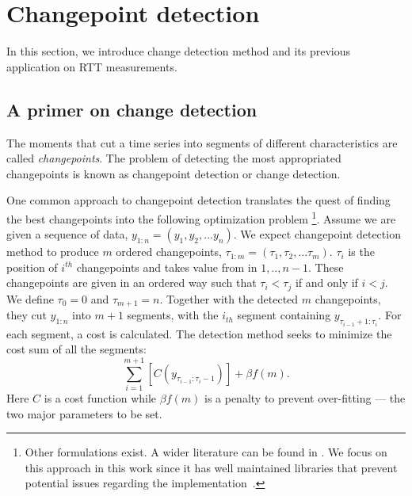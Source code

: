 \section{Changepoint detection}
\label{sec:cpt}
In this section, we introduce change detection method and its previous application on RTT measurements.

\subsection{A primer on change detection}
The moments that cut a time series into segments of different characteristics are called \textit{changepoints}.
The problem of detecting the most appropriated changepoints is known as changepoint detection or change detection.

One common approach to changepoint detection translates the quest of finding the best changepoints into the following optimization problem \footnote{Other formulations exist. A wider literature can be found in \cite{Haynes2016, Eckley2011}. We focus on this approach in this work since it has well maintained libraries that prevent potential issues regarding the implementation~\cite{Killick2013a, Haynes2016}.}.
Assume we are given a sequence of data, $y_{1:n} = (y_1, y_2,...y_n)$.
We expect changepoint detection method to produce $m$ ordered changepoints, $\tau_{1:m} = (\tau_1, \tau_2,...\tau_m)$.
$\tau_i$ is the position of $i^{th}$ changepoints and takes value from in ${1,..,n-1}$.
These changepoints are given in an ordered way such that $\tau_i < \tau_j$ if and only if $i < j$.
We define $\tau_0 = 0$ and $\tau_{m+1} = n$.
Together with the detected $m$ changepoints, they cut $y_{1:n}$ into $m+1$ segments, with the $i_{th}$ segment containing $y_{\tau_{i-1}+1:\tau_i}$.
For each segment, a cost is calculated. The detection method seeks to minimize the cost sum of all the segments: 
\begin{equation*}
\sum_{i=1}^{m+1}[C(y_{\tau_{i-1}:\tau_i-1})] + \beta f(m).
\end{equation*}
Here $C$ is a cost function while $\beta f(m)$ is a penalty to prevent over-fitting ---  the two major parameters to be set.

